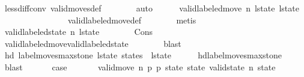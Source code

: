 \begin{isabellebody}
\ less{\isacharunderscore}diff{\isacharunderscore}conv\ valid{\isacharunderscore}moves{\isacharunderscore}def\isanewline
\ \ \ \ \ \ \isamarkupfalse%
\ auto\isanewline
\ \ \ \ \isamarkupfalse%
\ {\isachardoublequoteopen}valid{\isacharunderscore}labeled{\isacharunderscore}move\ n\ l{\isacharunderscore}state\ {\isacharquery}l{\isacharunderscore}state{\isacharprime}{\isachardoublequoteclose}\isanewline
\ \ \ \ \ \ \isamarkupfalse%
\ {\isacharasterisk}{\isacharasterisk}\isanewline
\ \ \ \ \ \ \isamarkupfalse%
\ valid{\isacharunderscore}labeled{\isacharunderscore}move{\isacharunderscore}def\isanewline
\ \ \ \ \ \ \isamarkupfalse%
\ metis\isanewline
\ \ \ \ \isamarkupfalse%
\ \isamarkupfalse%
\ {\isachardoublequoteopen}valid{\isacharunderscore}labeled{\isacharunderscore}state\ n\ {\isacharquery}l{\isacharunderscore}state{\isacharprime}{\isachardoublequoteclose}\isanewline
\ \ \ \ \ \ \isamarkupfalse%
\ Cons{\isacharparenleft}{}{\isacharparenright}\isanewline
\ \ \ \ \ \ \isamarkupfalse%
\ valid{\isacharunderscore}labeled{\isacharunderscore}move{\isacharunderscore}valid{\isacharunderscore}labeled{\isacharunderscore}state\isanewline
\ \ \ \ \ \ \isamarkupfalse%
\ blast\isanewline
\ \ \isamarkupfalse%
\isanewline
\ \ \isamarkupfalse%
\isanewline
\ \ \isamarkupfalse%
\ {\isachardoublequoteopen}hd\ {\isacharparenleft}label{\isacharunderscore}moves{\isacharunderscore}max{\isacharunderscore}stone\ {\isacharquery}l{\isacharunderscore}state{\isacharprime}\ states{\isacharparenright}\ {\isacharequal}\ {\isacharquery}l{\isacharunderscore}state{\isacharprime}{\isachardoublequoteclose}\isanewline
\ \ \ \ \isamarkupfalse%
\ hd{\isacharunderscore}label{\isacharunderscore}moves{\isacharunderscore}max{\isacharunderscore}stone\ \isamarkupfalse%
\ blast\isanewline
\ \ \isamarkupfalse%
\isanewline
\ \ \isamarkupfalse%
\ {\isacharquery}case\isanewline
\ \ \ \ \isamarkupfalse%
\ {\isacharasterisk}{\isacharasterisk}{\isacharasterisk}\ {\isacartoucheopen}valid{\isacharunderscore}move{\isacharprime}\ n\ {\isacharquery}p{}\ {\isacharquery}p{}\ {\isacharquery}state\ state{\isacharprime}{\isacartoucheclose}\ {\isacartoucheopen}valid{\isacharunderscore}state\ n\ {\isacharquery}state{\isacartoucheclose}\ \isanewline
\ \ \ \ \isamarkupfalse%

\end{isabellebody}
